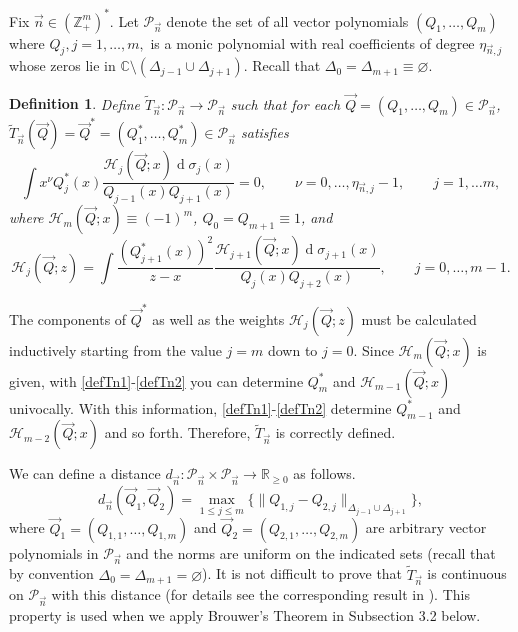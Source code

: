 \documentclass{amsart}
\numberwithin{equation}{section}
\newtheorem{definition}[theorem]{Definition}
\theoremstyle{definition}
\DeclareMathOperator{\D}{d}        %
\newcommand{\ZZ}{\mathbb{Z}}      %
\newcommand{\RR}{\mathbb{R}}      %
\newcommand{\n}{\vec{n}}          %
\begin{document}
    Fix $\n \in (\ZZ_+^m)^*$. Let $ \mathcal{P}_{\n} $ denote the set of all vector polynomials $(Q_1,\ldots,Q_m)$ where $Q_j, j=1,\ldots,m,$ is a monic polynomial  with real coefficients of degree $\eta_{\n,j}$
 whose zeros lie in $\mathbb{C} \setminus (\Delta_{j-1} \cup \Delta_{j+1})$. Recall that $\Delta_0 = \Delta_{m+1} \equiv \varnothing$.


    \begin{definition}
        \label{defTn} Define $\tilde{T}_{\n}: \mathcal{P}_{\n} \longrightarrow \mathcal{P}_{\n}$ such that for each ${\vec{Q}} = ({Q}_1,\ldots, {Q}_m) \in \mathcal{P}_{\n}$,  $\tilde{T}_{\n}(\vec{Q}) = \vec{Q}^* = ({Q}^*_1,\ldots,{Q}^*_m)\in \mathcal{P}_{\n}$ satisfies
        \begin{equation}
            \label{defTn1}
            \int x^\nu Q_{j}^*(x)\frac{\mathcal{H}_{j}( {\vec{Q}};x) \D \sigma_{j}(x)}{ {Q}_{j-1}(x) {Q}_{j+1}(x)} =0,\qquad \nu=0,\ldots,\eta_{\n,j} -1, \qquad j=1,\ldots m,
        \end{equation}
        where $\mathcal{H}_{m}({\vec{Q}};x) \equiv (-1)^m$, $Q_0 = Q_{m+1} \equiv 1$, and
        \begin{equation}
            \label{defTn2}
            \mathcal{H}_{j}( {\vec{Q}};z) = \int \frac{(Q^*_{j+1}(x))^2}{z-x}\frac{\mathcal{H}_{j+1}( {\vec{Q}};x)\D\sigma_{j+1}(x)}{ {Q}_{j}(x) {Q}_{j+2}(x)}, \qquad j=0,\ldots,m-1.
        \end{equation}
    \end{definition}

        The components of $\vec{Q}^*$ as well as the weights $\mathcal{H}_{j}( {\vec{Q}};z)$ must be calculated inductively starting from the value $j=m$ down to $j=0$. Since $\mathcal{H}_{m}({\vec{Q}};x)$ is given, with \eqref{defTn1}-\eqref{defTn2} you can determine $Q_m^*$ and $\mathcal{H}_{m-1}({\vec{Q}};x)$ univocally. With this information, \eqref{defTn1}-\eqref{defTn2} determine $Q_{m-1}^*$ and $\mathcal{H}_{m-2}({\vec{Q}};x)$ and so forth. Therefore, $\tilde{T}_{\n}$ is correctly defined.

        We can define a distance $d_{\n}: \mathcal{P}_{\n} \times \mathcal{P}_{\n} \longrightarrow \RR_{\geq 0}$ as follows.
        \[ d_{\n}(\vec{Q}_1, \vec{Q}_2) = \max_{1 \leq j \leq m}\{\|Q_{1,j} - Q_{2,j}\|_{\Delta_{j-1}\cup \Delta_{j+1}}\},
        \]
        where $\vec{Q}_1 = (Q_{1,1},\ldots,Q_{1,m})$ and $\vec{Q}_2 = (Q_{2,1},\ldots,Q_{2,m})$ are arbitrary vector polynomials in $\mathcal{P}_{\n}$ and the norms are uniform on the indicated sets (recall that by convention $\Delta_0 = \Delta_{m+1} = \varnothing$). It is not difficult to prove that $\tilde{T}_{\n}$ is continuous on $\mathcal{P}_{\n}$ with this distance (for details see the corresponding result in \cite[Subsection 3.6]{LGLago}). This property is used when we apply Brouwer's Theorem in Subsection 3.2 below.
\end{document}
